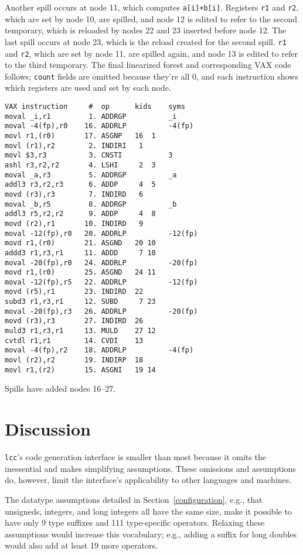 Another spill occurs at node 11, which computes \verb|a[i]+b[i]|.
Registers \verb|r1| and \verb|r2|, which are set by node 10, are spilled,
and node 12 is edited to refer to the second temporary, which is reloaded
by nodes 22 and 23 inserted before node 12.
The last spill occurs at node 23, which is the reload
created for the second spill. \verb|r1| and \verb|r2|, which are
set by node 11, are spilled again, and node 13 is edited
to refer to the third temporary.
The final linearized forest and corresponding VAX code follows;
\verb|count| fields are omitted because they're all 0,
and each instruction shows which registers are used and set by each node.
\begin{verbatim}
VAX instruction     #  op      kids    syms
moval _i,r1         1. ADDRGP          _i
moval -4(fp),r0    16. ADDRLP          -4(fp)
movl r1,(r0)       17. ASGNP   16  1
movl (r1),r2        2. INDIRI   1
movl $3,r3          3. CNSTI           3
ashl r3,r2,r2       4. LSHI     2  3
moval _a,r3         5. ADDRGP          _a
addl3 r3,r2,r3      6. ADDP     4  5
movd (r3),r3        7. INDIRD   6
moval _b,r5         8. ADDRGP          _b
addl3 r5,r2,r2      9. ADDP     4  8
movd (r2),r1       10. INDIRD   9
moval -12(fp),r0   20. ADDRLP          -12(fp)
movd r1,(r0)       21. ASGND   20 10
addd3 r1,r3,r1     11. ADDD     7 10
moval -20(fp),r0   24. ADDRLP          -20(fp)
movd r1,(r0)       25. ASGND   24 11
moval -12(fp),r5   22. ADDRLP          -12(fp)
movd (r5),r1       23. INDIRD  22
subd3 r1,r3,r1     12. SUBD     7 23
moval -20(fp),r3   26. ADDRLP          -20(fp)
movd (r3),r3       27. INDIRD  26
muld3 r1,r3,r1     13. MULD    27 12
cvtdl r1,r1        14. CVDI    13
moval -4(fp),r2    18. ADDRLP          -4(fp)
movl (r2),r2       19. INDIRP  18
movl r1,(r2)       15. ASGNI   19 14
\end{verbatim}
Spills have added nodes 16--27.


\section{Discussion}

\verb|lcc|'s code generation interface is smaller than most
because it omits the inessential and makes simplifying assumptions.
These omissions and assumptions do, however,
limit the interface's applicability to other languages and machines.

The datatype assumptions detailed in Section~\ref{configuration},
e.g., that unsigneds, integers, and long integers all have the same size,
make it possible to have only 9 type suffixes and 111 type-specific operators.
Relaxing these assumptions would increase this vocabulary;
e.g., adding a suffix for long doubles would also add at least
19 more operators.


